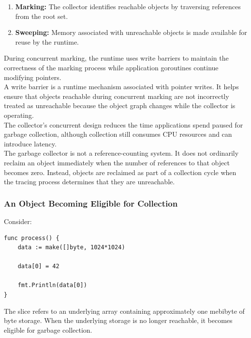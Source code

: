 \begin{enumerate}
    \item \textbf{Marking:} The collector identifies reachable objects by traversing references from the root set.
    \item \textbf{Sweeping:} Memory associated with unreachable objects is made available for reuse by the runtime.
\end{enumerate}

During concurrent marking, the runtime uses write barriers to maintain the correctness of the marking process while application goroutines continue modifying pointers.\\

A write barrier is a runtime mechanism associated with pointer writes. It helps ensure that objects reachable during concurrent marking are not incorrectly treated as unreachable because the object graph changes while the collector is operating.\\

The collector's concurrent design reduces the time applications spend paused for garbage collection, although collection still consumes CPU resources and can introduce latency.\\

The garbage collector is not a reference-counting system. It does not ordinarily reclaim an object immediately when the number of references to that object becomes zero. Instead, objects are reclaimed as part of a collection cycle when the tracing process determines that they are unreachable.\\

\subsubsection{An Object Becoming Eligible for Collection}

Consider:

\begin{lstlisting}
func process() {
    data := make([]byte, 1024*1024)

    data[0] = 42

    fmt.Println(data[0])
}
\end{lstlisting}

The slice refers to an underlying array containing approximately one mebibyte of byte storage. When the underlying storage is no longer reachable, it becomes eligible for garbage collection.\\


